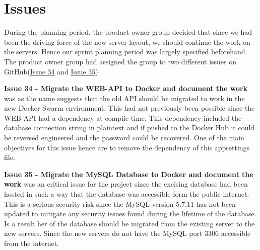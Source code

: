 \section{Issues}
During the planning period, the product owner group decided that since we had been the driving force of the new server layout, we should continue the work on the servers. 
Hence our sprint planning period was largely specified beforehand. 
The product owner group had assigned the group to two different issues on GitHub(\href{https://github.com/aau-giraf/wiki/issues/34}{Issue 34} and \href{https://github.com/aau-giraf/wiki/issues/35}{Issue 35})

\textbf{Issue 34 - Migrate the WEB-API to Docker and document the work} was as the name suggests that the old API should be migrated to work in the new Docker Swarm environment. 
This had not previously been possible since the WEB API had a dependency at compile time. 
This dependency included the database connection string in plaintext and if pushed to the Docker Hub it could be reversed engineered and the password could be recovered. 
One of the main objectives for this issue hence are to remove the dependency of this appsettings file. 

\textbf{Issue 35 - Migrate the MySQL Database to Docker and document the work} was an critical issue for the project since the excising database had been hosted in such a way that the database was accessible form the public internet. 
This is a serious security risk since the MySQL version 5.7.11 has not been updated to mitigate any security issues found during the lifetime of the database. 
Is a result her of the database should be migrated from the existing server to the new servers. 
Since the new servers do not have the MySQL port $3306$ accessible from the internet. 

